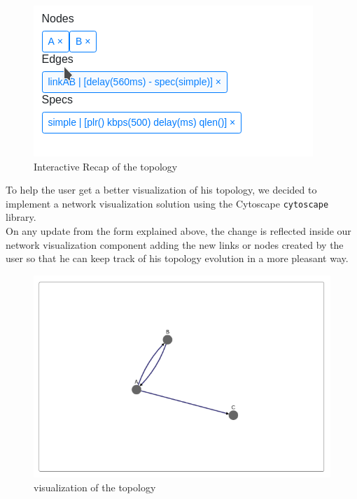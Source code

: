 \documentclass{eplmastersthesis}
\begin{document}
        \begin{figure}[H]
          \centering
          \includegraphics[scale=0.6]{figures/recap_topology.png}
          \caption{\label{recap_topology} Interactive Recap of the topology}
        \end{figure}

        To help the user get a better visualization of his topology, we
        decided to implement a network visualization solution using the
        Cytoscape \texttt{cytoscape} library.\\
        On any update from the form explained above, the change is reflected
        inside our network visualization component adding the new links or
        nodes created by the user so that he can keep track of his topology
        evolution in a more pleasant way.\\

        \begin{figure}[H]
          \centering
          \includegraphics[scale=0.6]{figures/visual_topology.png}
          \caption{\label{visual_topology} visualization of the topology}
        \end{figure}
\end{document}
